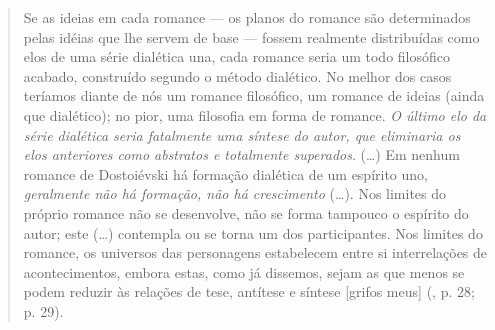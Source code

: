 \begin{quote}
Se as ideias em cada romance --- os planos do romance são determinados
pelas idéias que lhe servem de base --- fossem realmente distribuídas
como elos de uma série dialética una, cada romance seria um todo
filosófico acabado, construído segundo o método dialético. No melhor dos
casos teríamos diante de nós um romance filosófico, um romance de ideias
(ainda que dialético); no pior, uma filosofia em forma de romance.
\emph{O último elo da série dialética seria fatalmente uma síntese do
autor, que eliminaria os elos anteriores como abstratos e totalmente
superados}. (\ldots) Em nenhum romance de Dostoiévski há formação dialética
de um espírito uno, \emph{geralmente não há formação, não há
crescimento} (\ldots). Nos limites do próprio romance não se desenvolve,
não se forma tampouco o espírito do autor; este (\ldots) contempla ou se
torna um dos participantes. Nos limites do romance, os universos das
personagens estabelecem entre si interrelações de acontecimentos, embora
estas, como já dissemos, sejam as que menos se podem reduzir às relações
de tese, antítese e síntese {[}grifos meus{]} (, p. 28; p. 29).
\end{quote}


